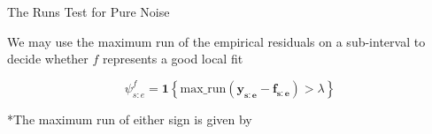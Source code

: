 \documentclass{beamer}
\begin{document}
\begin{frame}{The Runs Test for Pure Noise}

\begin{exampleblock}{}
We may use the maximum run of the empirical residuals on a sub-interval to decide whether $f$ represents a good local fit

\begin{equation*}
	\psi_{s:e}^f = \mathbf{1} \left \{ \text{max\_run} (\mathbf{y_{s:e} - f_{s:e}}) > \lambda \right \}
	\label{equation: local runs test}
\end{equation*}
\end{exampleblock}

\bigskip

*The maximum run of either sign is given by

\bigskip 




\end{frame}
\end{document}
